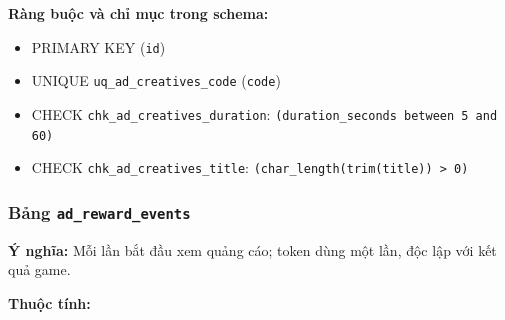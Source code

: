 \textbf{Ràng buộc và chỉ mục trong schema:}

\begin{itemize}

\item PRIMARY KEY (\texttt{id})

\item UNIQUE \texttt{uq\_ad\_creatives\_code} (\texttt{code})

\item CHECK \texttt{chk\_ad\_creatives\_duration}: \texttt{(duration\_seconds between 5 and 60)}

\item CHECK \texttt{chk\_ad\_creatives\_title}: \texttt{(char\_length(trim(title)) > 0)}

\end{itemize}

\subsubsection{Bảng \texttt{ad\_reward\_events}}

\textbf{Ý nghĩa:} Mỗi lần bắt đầu xem quảng cáo; token dùng một lần, độc lập với kết quả game.\par

\textbf{Thuộc tính:}

